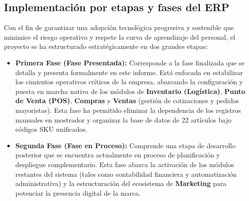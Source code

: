 \subsection{Implementación por etapas y fases del ERP}
\begin{indentedsubsection}
Con el fin de garantizar una adopción tecnológica progresiva y sostenible que minimice el riesgo operativo y respete la curva de aprendizaje del personal, el proyecto se ha estructurado estratégicamente en dos grandes etapas:

\begin{itemize}
    \item \textbf{Primera Fase (Fase Presentada):} Corresponde a la fase finalizada que se detalla y presenta formalmente en este informe. Está enfocada en estabilizar los cimientos operativos críticos de la empresa, abarcando la configuración y puesta en marcha nativa de los módulos de \textbf{Inventario (Logística)}, \textbf{Punto de Venta (POS)}, \textbf{Compras} y \textbf{Ventas} (gestión de cotizaciones y pedidos mayoristas). Esta fase ha permitido eliminar la dependencia de los registros manuales en mostrador y organizar la base de datos de 22 artículos bajo códigos SKU unificados.
    \item \textbf{Segunda Fase (Fase en Proceso):} Comprende una etapa de desarrollo posterior que se encuentra actualmente en proceso de planificación y despliegue complementario. Esta fase abarca la activación de los módulos restantes del sistema (tales como contabilidad financiera y automatización administrativa) y la estructuración del ecosistema de \textbf{Marketing} para potenciar la presencia digital de la marca.
\end{itemize}
\end{indentedsubsection}
